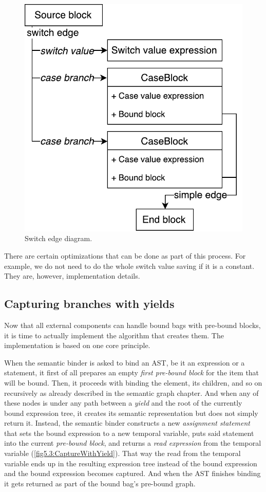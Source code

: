 \begin{figure}[H]
	\centering	
	\includegraphics[scale=0.75]{../img/5_3_switchEdge}	
	\caption{Switch edge diagram.}
	\label{fig5.3:SwitchEdge}
\end{figure}

There are certain optimizations that can be done as part of this process. For example, we do not need to do the whole switch value saving if it is a constant. They are, however, implementation details. 

\subsection{Capturing branches with yields}

Now that all external components can handle bound bags with pre-bound blocks, it is time to actually implement the algorithm that creates them. The implementation is based on one core principle. 

When the semantic binder is asked to bind an AST, be it an expression or a statement, it first of all prepares an empty \emph{first pre-bound block} for the item that will be bound. Then, it proceeds with binding the element, its children, and so on recursively as already described in the semantic graph chapter. And when any of these nodes is under any path between a \emph{yield} and the root of the currently bound expression tree, it creates its semantic representation but does not simply return it. Instead, the semantic binder constructs a new \emph{assignment statement} that sets the bound expression to a new temporal variable, puts said statement into the current \emph{pre-bound block}, and returns a \emph{read expression} from the temporal variable (\autoref{fig5.3:CaptureWithYield}). That way the read from the temporal variable ends up in the resulting expression tree instead of the bound expression and the bound expression becomes captured. And when the AST finishes binding it gets returned as part of the bound bag’s pre-bound graph.


